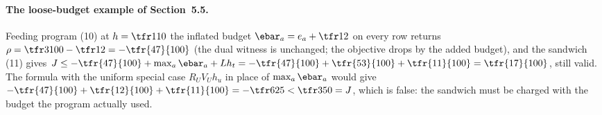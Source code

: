 \paragraph{The loose-budget example of Section~5.5.}
Feeding program (10) at $h=\tfr1{10}$ the inflated budget $\ebar_a=e_a+\tfr12$ on every row returns $\rho=\tfr3{100}-\tfr12=-\tfr{47}{100}$ (the dual witness is unchanged; the objective drops by the added budget), and the sandwich (11) gives $J\le-\tfr{47}{100}+\max_a\ebar_a+Lh_t=-\tfr{47}{100}+\tfr{53}{100}+\tfr{11}{100}=\tfr{17}{100}$, still valid. The formula with the uniform special case $R_UV_Uh_u$ in place of $\max_a\ebar_a$ would give $-\tfr{47}{100}+\tfr{12}{100}+\tfr{11}{100}=-\tfr6{25}<\tfr3{50}=J$, which is false: the sandwich must be charged with the budget the program actually used.
